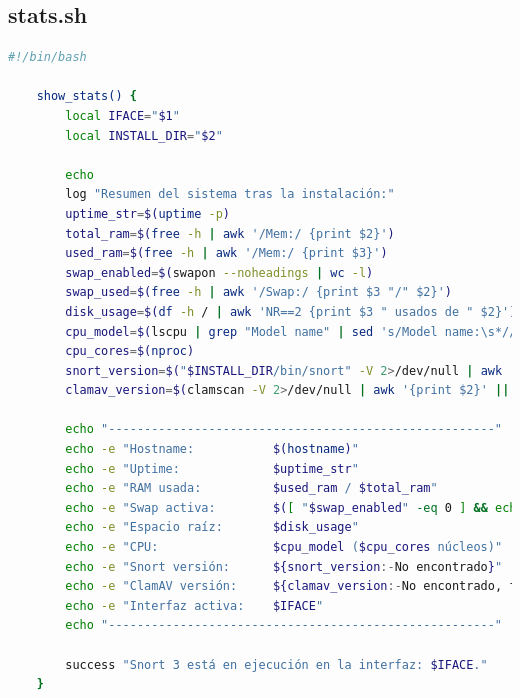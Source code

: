 \documentclass[11pt,a4paper,twoside]{report}
\begin{document}
\subsection*{stats.sh}
\begin{lstlisting}[language=bash, caption={\texttt{stats.sh}}, label={lst:stats-sh}]
	#!/bin/bash
	
	show_stats() {
		local IFACE="$1"
		local INSTALL_DIR="$2"
		
		echo
		log "Resumen del sistema tras la instalación:"
		uptime_str=$(uptime -p)
		total_ram=$(free -h | awk '/Mem:/ {print $2}')
		used_ram=$(free -h | awk '/Mem:/ {print $3}')
		swap_enabled=$(swapon --noheadings | wc -l)
		swap_used=$(free -h | awk '/Swap:/ {print $3 "/" $2}')
		disk_usage=$(df -h / | awk 'NR==2 {print $3 " usados de " $2}')
		cpu_model=$(lscpu | grep "Model name" | sed 's/Model name:\s*//')
		cpu_cores=$(nproc)
		snort_version=$("$INSTALL_DIR/bin/snort" -V 2>/dev/null | awk '/Version/{print $4; exit}' || echo "No encontrado")
		clamav_version=$(clamscan -V 2>/dev/null | awk '{print $2}' || echo "No encontrado")
		
		echo "------------------------------------------------------"
		echo -e "Hostname:           $(hostname)"
		echo -e "Uptime:             $uptime_str"
		echo -e "RAM usada:          $used_ram / $total_ram"
		echo -e "Swap activa:        $([ "$swap_enabled" -eq 0 ] && echo "No" || echo "Sí ($swap_used)")"
		echo -e "Espacio raíz:       $disk_usage"
		echo -e "CPU:                $cpu_model ($cpu_cores núcleos)"
		echo -e "Snort versión:      ${snort_version:-No encontrado}"
		echo -e "ClamAV versión:     ${clamav_version:-No encontrado, falta instalar}"
		echo -e "Interfaz activa:    $IFACE"
		echo "------------------------------------------------------"
		
		success "Snort 3 está en ejecución en la interfaz: $IFACE."
	}
\end{lstlisting}
\end{document}
